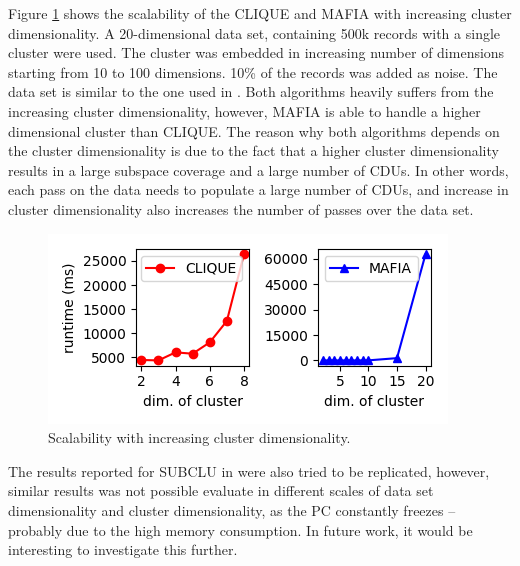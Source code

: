 Figure \ref{fig:cluster_dimensionality_vs_runtime} shows the scalability of the CLIQUE and MAFIA with increasing cluster dimensionality. A 20-dimensional data set, containing 500k records with a single cluster were used. The cluster was embedded in increasing number of dimensions starting from 10 to 100 dimensions. 10\% of the records was added as noise. The data set is similar to the one used in \cite{mafia}. Both algorithms heavily suffers from the increasing cluster dimensionality, however, MAFIA is able to handle a higher dimensional cluster than CLIQUE. The reason why both algorithms depends on the cluster dimensionality is due to the fact that a higher cluster dimensionality results in a large subspace coverage and a large number of CDUs. In other words, each pass on the data needs to populate a large number of CDUs, and increase in cluster dimensionality also increases the number of passes over the data set.
\begin{figure}[H]
    \vspace*{-0.5cm}
    \centering
    \includegraphics[scale=0.45]{figures/cluster_dimensionality_vs_runtime.png}
    \caption{Scalability with increasing cluster dimensionality.}
    \label{fig:cluster_dimensionality_vs_runtime}
    \vspace*{-0.5cm}
\end{figure}

The results reported for SUBCLU in \cite{subclu} were also tried to be replicated, however, similar results was not possible evaluate in different scales of data set dimensionality and cluster dimensionality, as the PC constantly freezes -- probably due to the high memory consumption. In future work, it would be interesting to investigate this further.

